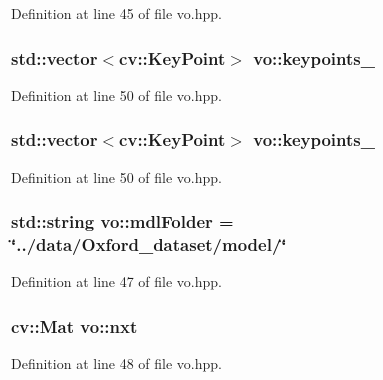 Definition at line 45 of file vo.\+hpp.

\subsubsection[{\texorpdfstring{keypoints\+\_\+1}{keypoints_1}}]{\setlength{\rightskip}{0pt plus 5cm}std\+::vector$<$cv\+::\+Key\+Point$>$ vo\+::keypoints\+\_}\hypertarget{classvo_aa56b968f07f89745eef44ea60c0a1fde}{}\label{classvo_aa56b968f07f89745eef44ea60c0a1fde}


Definition at line 50 of file vo.\+hpp.

\subsubsection[{\texorpdfstring{keypoints\+\_\+2}{keypoints_2}}]{\setlength{\rightskip}{0pt plus 5cm}std\+::vector$<$cv\+::\+Key\+Point$>$ vo\+::keypoints\+\_}\hypertarget{classvo_ac3d7d1e40686a1def952e5b2bdde8086}{}\label{classvo_ac3d7d1e40686a1def952e5b2bdde8086}


Definition at line 50 of file vo.\+hpp.

\subsubsection[{\texorpdfstring{mdl\+Folder}{mdlFolder}}]{\setlength{\rightskip}{0pt plus 5cm}std\+::string vo\+::mdl\+Folder = \char`\"{}../data/Oxford\+\_\+dataset/model/\char`\"{}}\hypertarget{classvo_a6cec8c62c2984586bece5102f2d55d02}{}\label{classvo_a6cec8c62c2984586bece5102f2d55d02}


Definition at line 47 of file vo.\+hpp.

\subsubsection[{\texorpdfstring{nxt}{nxt}}]{\setlength{\rightskip}{0pt plus 5cm}cv\+::\+Mat vo\+::nxt}\hypertarget{classvo_ac8de029d16a1894dc7b6bc1b20ff52d9}{}\label{classvo_ac8de029d16a1894dc7b6bc1b20ff52d9}


Definition at line 48 of file vo.\+hpp.

